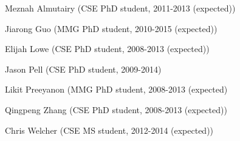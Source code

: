 \documentclass[margin,line]{resume}
\begin{document}
\begin{resume}
\begin{list1}
\item[] Meznah Almutairy (CSE PhD student, 2011-2013 (expected))
\item[] Jiarong Guo (MMG PhD student, 2010-2015 (expected))
\item[] Elijah Lowe (CSE PhD student, 2008-2013 (expected))
\item[] Jason Pell (CSE PhD student, 2009-2014)
\item[] Likit Preeyanon (MMG PhD student, 2008-2013 (expected)
\item[] Qingpeng Zhang (CSE PhD student, 2008-2013 (expected))
\item[] Chris Welcher (CSE MS student, 2012-2014 (expected))
\end{list1}

\end{resume}
\end{document}

